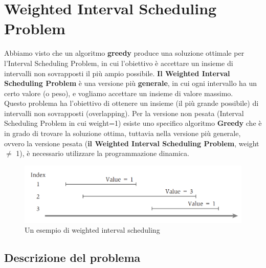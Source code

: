\chapter{Weighted Interval Scheduling
  Problem}

Abbiamo visto che un algoritmo \textbf{greedy} produce una soluzione
ottimale per l'Interval Scheduling Problem, in cui l'obiettivo è
accettare un insieme di intervalli non sovrapposti il più ampio
possibile. \textbf{Il Weighted Interval Scheduling Problem} è una
versione più \textbf{generale}, in cui ogni intervallo ha un certo
valore (o peso), e vogliamo accettare un insieme di valore massimo.\\

Questo problema ha l'obiettivo di ottenere un insieme (il più grande
possibile) di intervalli non sovrapposti (overlapping). Per la versione
non pesata (Interval Scheduling Problem in cui weight=1) esiste uno
specifico algoritmo \textbf{Greedy} che è in grado di trovare la
soluzione ottima, tuttavia nella versione più generale, ovvero la
versione pesata (\textbf{il Weighted Interval Scheduling Problem},
weight $\neq$ 1), è necessario utilizzare la programmazione dinamica.

\begin{figure}[H]
      \includegraphics[width=\textwidth]{capitoli/programmazione_dinamica/imgs/weigted_interval_scheduling.png}
      \centering
      \caption{Un esempio di weighted interval scheduling}
\end{figure}

\section{Descrizione del problema}

